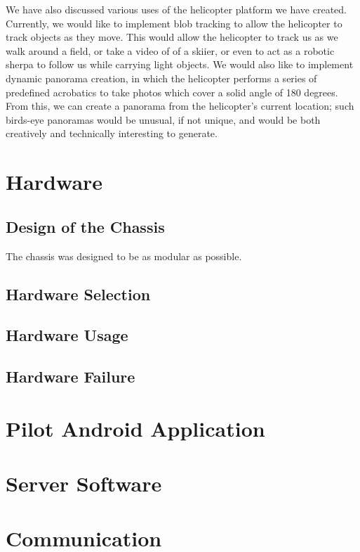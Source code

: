 \documentclass[letterpaper]{article}
\begin{document}
We have also discussed various uses of the helicopter platform we have
created. Currently, we would like to implement blob tracking to allow
the helicopter to track objects as they move. This would allow the
helicopter to track us as we walk around a field, or take a video of
of a skiier, or even to act as a robotic sherpa to follow us while
carrying light objects. We would also like to implement dynamic
panorama creation, in which the helicopter performs a series of
predefined acrobatics to take photos which cover a solid angle of 180
degrees. From this, we can create a panorama from the helicopter's
current location; such birds-eye panoramas would be unusual, if not
unique, and would be both creatively and technically interesting to
generate.

\section{Hardware}
\subsection{Design of the Chassis}
The chassis was designed to be as modular as possible. 

\subsection{Hardware Selection}

\subsection{Hardware Usage}

\subsection{Hardware Failure}
\label{sec:failure}

\section{Pilot Android Application}
\label{sec:pilot}

\section{Server Software}

\section{Communication}
\end{document}
